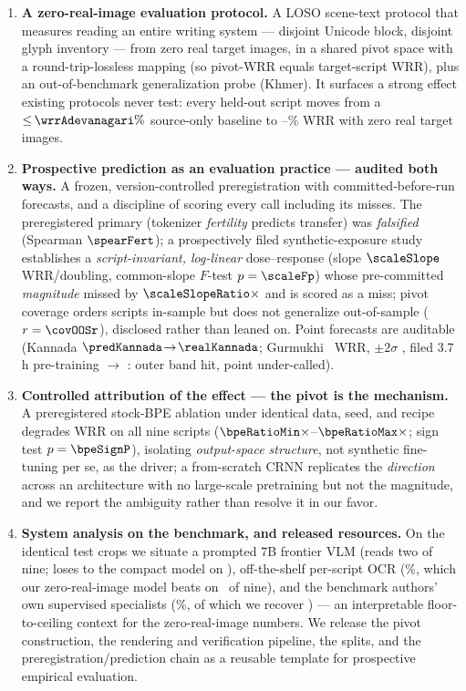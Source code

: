 \begin{enumerate}
  \item \textbf{A zero-real-image evaluation protocol.} A LOSO scene-text protocol that measures
  reading an entire writing system --- disjoint Unicode block, disjoint glyph inventory --- from
  zero real target images, in a shared pivot space with a round-trip-lossless mapping (so pivot-WRR
  equals target-script WRR), plus an out-of-benchmark generalization probe (Khmer). It surfaces a
  strong effect existing protocols never test: every held-out script moves from a
  ${\le}\,\wrrAdevanagari\%$ source-only baseline to \wrrBmin--\wrrBmax\% WRR with zero real target
  images.
  \item \textbf{Prospective prediction as an evaluation practice --- audited both ways.} A frozen,
  version-controlled preregistration with committed-before-run forecasts, and a discipline of
  scoring every call including its misses. The preregistered primary (tokenizer \emph{fertility}
  predicts transfer) was \emph{falsified} (Spearman $\spearFert$); a prospectively filed
  synthetic-exposure study establishes a \emph{script-invariant, log-linear} dose--response
  (slope $\scaleSlope$ WRR/doubling, common-slope $F$-test $p=\scaleFp$) whose pre-committed
  \emph{magnitude} missed by $\scaleSlopeRatio\times$ and is scored as a miss; pivot coverage orders
  scripts in-sample but does not generalize out-of-sample ($r=\covOOSr$), disclosed rather than
  leaned on. Point forecasts are auditable (Kannada $\predKannada\!\to\!\realKannada$; Gurmukhi
  \predGurmukhi\ WRR, $\pm2\sigma$ \predGurmukhiTwoSig, filed 3.7\,h pre-training $\to$
  \realGurmukhi: outer band hit, point under-called).
  \item \textbf{Controlled attribution of the effect --- the pivot is the mechanism.} A
  preregistered stock-BPE ablation under identical data, seed, and recipe degrades WRR on all nine
  scripts ($\bpeRatioMin\times$--$\bpeRatioMax\times$; sign test $p=\bpeSignP$), isolating
  \emph{output-space structure}, not synthetic fine-tuning per se, as the driver; a from-scratch
  CRNN replicates the \emph{direction} across an architecture with no large-scale pretraining but
  not the magnitude, and we report the ambiguity rather than resolve it in our favor.
  \item \textbf{System analysis on the benchmark, and released resources.} On the identical test
  crops we situate a prompted 7B frontier VLM (reads two of nine; loses to the compact model on
  \vlmScriptsWon), off-the-shelf per-script OCR (\tessMean\%, which our zero-real-image model beats
  on \tessScriptsWon\ of nine), and the benchmark authors' own supervised specialists
  (\parseqMean\%, of which we recover \oursOverCeiling) --- an interpretable floor-to-ceiling
  context for the zero-real-image numbers. We release the
  pivot construction, the rendering and verification pipeline, the splits, and the
  preregistration/prediction chain as a reusable template for prospective empirical evaluation.
\end{enumerate}

